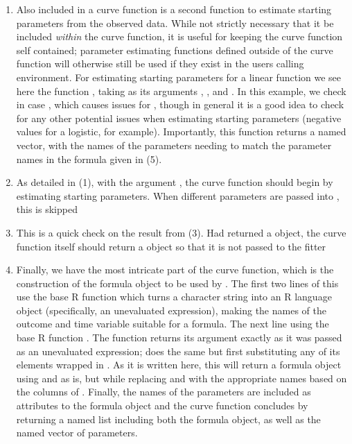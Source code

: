 \begin{enumerate}
\item Also included in a curve function is a second function to estimate starting parameters from the observed data. While not strictly necessary that it be included \textit{within} the curve function, it is useful for keeping the curve function self contained; parameter estimating functions defined outside of the curve function will otherwise still be used if they exist in the users calling environment. For estimating starting parameters for a linear function we see here the function , taking as  its arguments , , and . In this example, we check in case , which causes issues for , though in general it is a good idea to check for any other potential issues when estimating starting parameters (negative values for a logistic, for example). Importantly, this function returns a named vector, with the names of the parameters needing to match the parameter names in the formula given in (5). 
\item As detailed in (1), with the argument , the curve function should begin by estimating starting parameters. When different parameters are passed into , this is skipped
\item This is a quick check on the result from (3). Had  returned a  object, the curve function itself should return a  object so that it is not passed to the fitter
\item Finally, we have the most intricate part of the curve function, which is the construction of the formula object to be used by . The first two lines of this use the base R function  which turns a character string into an R language object (specifically, an unevaluated expression), making the names of the outcome and time variable suitable for a formula. The next line using the base R function . The function  returns its argument exactly as it was passed as an unevaluated expression;  does the same but first substituting any of its elements wrapped in . As it is written here, this will return a formula object using  and  as is, but while replacing  and  with the appropriate names based on the columns of . Finally, the names of the parameters are included as attributes to the formula object and the curve function concludes by returning a named list including both the formula object, as well as the named vector of parameters.
\end{enumerate}

